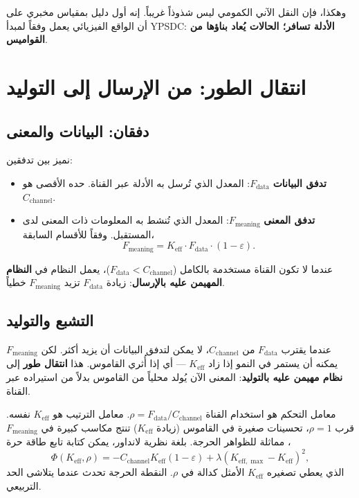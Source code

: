 \documentclass[12pt,a4paper]{article}
\newcommand{\Keff}{K_{\mathrm{eff}}}
\newcommand{\Keffmax}{K_{\mathrm{eff},\max}}
\theoremstyle{remark}
\begin{document}
	وهكذا، فإن النقل الآني الكمومي ليس شذوذاً غريباً. إنه أول دليل بمقياس مخبري على أن الواقع الفيزيائي يعمل وفقاً لمبدأ YPSDC: \textbf{الأدلة تسافر؛ الحالات يُعاد بناؤها من القواميس}.
	
	\section{انتقال الطور: من الإرسال إلى التوليد}
	\label{sec:transition}
	
	\subsection{دفقان: البيانات والمعنى}
	
	نميز بين تدفقين:
	\begin{itemize}
		\item \textbf{تدفق البيانات} \(F_{\text{data}}\): المعدل الذي تُرسل به الأدلة عبر القناة. حده الأقصى هو \(C_{\text{channel}}\).
		\item \textbf{تدفق المعنى} \(F_{\text{meaning}}\): المعدل الذي تُنشط به المعلومات ذات المعنى لدى المستقبل. وفقاً للأقسام السابقة،
		\[
		F_{\text{meaning}} = \Keff \cdot F_{\text{data}} \cdot (1 - \varepsilon).
		\]
	\end{itemize}
	
	عندما لا تكون القناة مستخدمة بالكامل (\(F_{\text{data}} < C_{\text{channel}}\))، يعمل النظام في \textbf{النظام المهيمن عليه بالإرسال}: زيادة \(F_{\text{data}}\) تزيد \(F_{\text{meaning}}\) خطياً.
	
	\subsection{التشبع والتوليد}
	
	عندما يقترب \(F_{\text{data}}\) من \(C_{\text{channel}}\)، لا يمكن لتدفق البيانات أن يزيد أكثر. لكن \(F_{\text{meaning}}\) يمكنه أن يستمر في النمو إذا زاد \(\Keff\) — أي إذا أُثري القاموس. هذا \textbf{انتقال طور} إلى \textbf{نظام مهيمن عليه بالتوليد}: المعنى الآن يُولد محلياً من القاموس بدلاً من استيراده عبر القناة.
	
	معامل التحكم هو استخدام القناة \(\rho = F_{\text{data}} / C_{\text{channel}}\). معامل الترتيب هو \(\Keff\) نفسه. قرب \(\rho = 1\)، تحسينات صغيرة في القاموس (زيادة \(\Keff\)) تنتج مكاسب كبيرة في \(F_{\text{meaning}}\)، مماثلة للظواهر الحرجة. بلغة نظرية لانداور، يمكن كتابة تابع طاقة حرة
	\[
	\Phi(\Keff, \rho) = -C_{\text{channel}} \Keff (1 - \varepsilon) + \lambda (\Keffmax - \Keff)^2,
	\]
	الذي يعطي تصغيره \(\Keff\) الأمثل كدالة في \(\rho\). النقطة الحرجة تحدث عندما يتلاشى الحد التربيعي.
	
\end{document}
